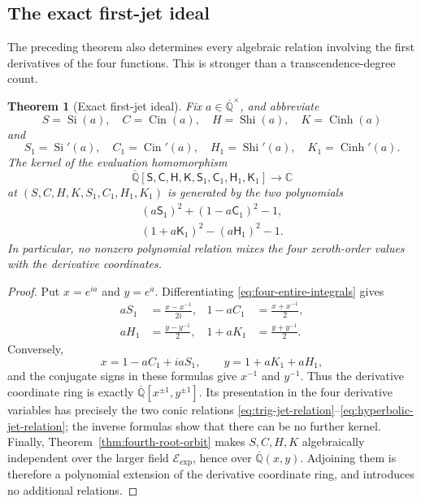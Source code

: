 \documentclass[11pt]{article}
\newtheorem{theorem}{Theorem}[section]
\theoremstyle{definition}
\theoremstyle{remark}
\newcommand{\Qbar}{\overline{\mathbb Q}}
\newcommand{\C}{\mathbb C}
\newcommand{\Cin}{\operatorname{Cin}}
\newcommand{\Eexp}{\mathcal E_{\mathrm{exp}}}
\newcommand{\Si}{\operatorname{Si}}
\newcommand{\Shi}{\operatorname{Shi}}
\newcommand{\Cinh}{\operatorname{Cinh}}
\begin{document}
\subsection{The exact first-jet ideal}

The preceding theorem also determines every algebraic relation involving
the first derivatives of the four functions.  This is stronger than a
transcendence-degree count.

\begin{theorem}[Exact first-jet ideal]\label{thm:first-jet-ideal}
Fix \(a\in\Qbar^\times\), and abbreviate
\[
 S=\Si(a),\quad C=\Cin(a),\quad H=\Shi(a),\quad K=\Cinh(a)
\]
and
\[
 S_1=\Si'(a),\quad C_1=\Cin'(a),\quad
 H_1=\Shi'(a),\quad K_1=\Cinh'(a).
\]
The kernel of the evaluation homomorphism
\[
 \Qbar[\mathsf S,\mathsf C,\mathsf H,\mathsf K,
       \mathsf S_1,\mathsf C_1,\mathsf H_1,\mathsf K_1]
 \longrightarrow\C
\]
at \((S,C,H,K,S_1,C_1,H_1,K_1)\) is generated by the two polynomials
\begin{align}
 (a\mathsf S_1)^2+(1-a\mathsf C_1)^2-1,
 \label{eq:trig-jet-relation}\\
 (1+a\mathsf K_1)^2-(a\mathsf H_1)^2-1.
 \label{eq:hyperbolic-jet-relation}
\end{align}
In particular, no nonzero polynomial relation mixes the four zeroth-order
values with the derivative coordinates.
\end{theorem}

\begin{proof}
Put \(x=e^{ia}\) and \(y=e^a\).  Differentiating
\eqref{eq:four-entire-integrals} gives
\begin{equation}\label{eq:jet-torus-coordinates}
\begin{aligned}
 aS_1&=\frac{x-x^{-1}}{2i},&
 1-aC_1&=\frac{x+x^{-1}}2,\\
 aH_1&=\frac{y-y^{-1}}2,&
 1+aK_1&=\frac{y+y^{-1}}2.
\end{aligned}
\end{equation}
Conversely,
\[
 x=1-aC_1+iaS_1,\qquad y=1+aK_1+aH_1,
\]
and the conjugate signs in these formulas give \(x^{-1}\) and \(y^{-1}\).
Thus the derivative coordinate ring is exactly
\(\Qbar[x^{\pm1},y^{\pm1}]\).  Its presentation in the four derivative
variables has precisely the two conic relations
\eqref{eq:trig-jet-relation}--\eqref{eq:hyperbolic-jet-relation}; the
inverse formulas show that there can be no further kernel.  Finally,
Theorem~\ref{thm:fourth-root-orbit} makes \(S,C,H,K\) algebraically
independent over the larger field \(\Eexp\), hence over
\(\Qbar(x,y)\).  Adjoining them is therefore a polynomial extension of the
derivative coordinate ring, and introduces no additional relations.
\end{proof}
\end{document}
